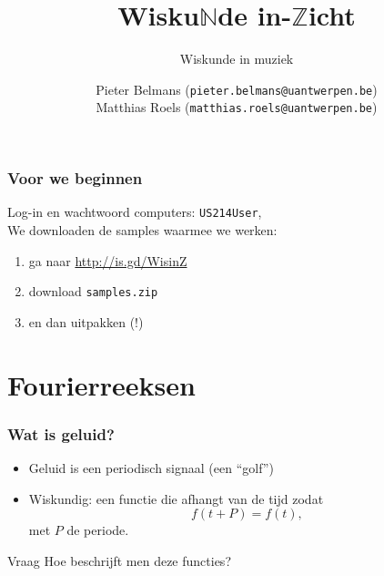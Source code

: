 \documentclass[compress, darktitle, framenumber, totalframenumber]{beamer}
\title{Wisku$\mathbb{N}$de in-$\mathbb{Z}$icht}
\subtitle{Wiskunde in muziek}
\author{Pieter Belmans (\texttt{pieter.belmans@uantwerpen.be}) \\ Matthias Roels (\texttt{matthias.roels@uantwerpen.be})}
\date{}
\begin{document}
\begin{frame}
  \titlepage
\end{frame}

\begin{frame}
  \frametitle{Voor we beginnen}
  Log-in en wachtwoord computers: \texttt{US214User},   \\[.2cm] \noindent
  We downloaden de samples waarmee we werken:
  \begin{enumerate}
    \item ga naar \url{http://is.gd/WisinZ}
    \item download \texttt{samples.zip}
    \item en dan uitpakken (!)
  \end{enumerate}
  
\end{frame}

\section{Fourierreeksen}

\begin{frame}
\frametitle{Wat is geluid?}
\begin{itemize}
\item Geluid is een periodisch signaal (een ``golf'') 
\item Wiskundig: een functie die afhangt van de tijd zodat 
\begin{equation*}
f(t+P)=f(t),
\end{equation*}
met $P$ de periode.
\end{itemize}
\begin{block}{Vraag}
Hoe beschrijft men deze functies? 
\end{block}
\end{frame}
\end{document}
